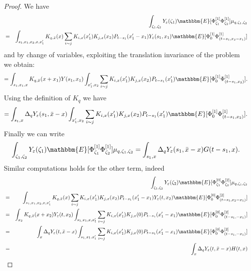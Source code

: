 \begin{proof}
  We have
  \begin{eqnarray*}
    &  & \int_{\zeta_1, \zeta_2} Y_{\varepsilon} (\zeta_1) \mathbbm{E}
    [\Phi^{[1]}_{\zeta_1} \Phi^{[1]}_{\zeta_2}] \mu_{q, \zeta_1, \zeta_2}\\
    & = & \int_{s_1, x_1, x_2, x, x_1'} K_{q, \bar{x}} (x) \sum_{i \sim j}
    K_{i, x} (x_1') K_{j, x} (x_2) P_{t - s_1} (x_1' - x_1) Y_{\varepsilon}
    (s_1, x_1) \mathbbm{E} [\Phi^{[1]}_0 \Phi^{[1]}_{(t - s_1, x_2 - x_1)}]
  \end{eqnarray*}
  and by change of variables, exploiting the translation invariance of the
  problem we obtain:
  \[ = \int_{s_1, x_1, x} K_{q, \bar{x}} (x + x_1) Y (s_1, x_1) \int_{x_1',
     x_2}  \sum_{i \sim j} K_{i, x} (x_1') K_{j, x} (x_2) P_{t - s_1} (x_1')
     \mathbbm{E} [\Phi^{[1]}_0 \Phi^{[1]}_{(t - s_1, x_2)}] . \]
  Using the definition of $K_q$ we have
  \[ = \int_{s_1, x} \Delta_q Y_{\varepsilon} (s_1, \bar{x} - x) \int_{x_1',
     x_2}  \sum_{i \sim j} K_{i, x} (x_1') K_{j, x} (x_2) P_{t - s_1} (x_1')
     \mathbbm{E} [\Phi^{[1]}_0 \Phi^{[1]}_{(t - s_1, x_2)}] . \]
  Finally we can write
  \[ \int_{\zeta_1, \zeta_2} Y_{\varepsilon} (\zeta_1) \mathbbm{E}
     [\Phi^{[1]}_{\zeta_1} \Phi^{[1]}_{\zeta_2}] \mu_{q, \zeta_1, \zeta_2} =
     \int_{s_1, x} \Delta_q Y_{\varepsilon} (s_1, \bar{x} - x) G (t - s_1, x)
     . \]
  Similar computations holds for the other term, indeed
  \begin{eqnarray*}
    &  & \int_{\zeta_1, \zeta_2} Y_{\varepsilon} (\zeta_2) \mathbbm{E}
    [\Phi^{[0]}_{\zeta_1} \Phi^{[2]}_{\zeta_2}] \mu_{q, \zeta_1, \zeta_2}\\
    & = & \int_{s_1, x_1, x_2, x, x_1'} K_{q, \bar{x}} (x) \sum_{i \sim j}
    K_{i, x} (x_1') K_{j, x} (x_2) P_{t - s_1} (x_1' - x_1) Y_{\varepsilon}
    (t, x_2) \mathbbm{E} [\Phi^{[0]}_0 \Phi^{[2]}_{(t - s_1, x_2 - x_1)}]\\
    & = & \int_{x_2} K_{q, \bar{x}} (x + x_2) Y_{\varepsilon} (t, x_2)
    \int_{s_{1,} x_1, x, x_1'}  \sum_{i \sim j} K_{i, x} (x_1') K_{j, x} (0)
    P_{t - s_1} (x_1' - x_1) \mathbbm{E} [\Phi^{[0]}_0 \Phi^{[2]}_{(t - s_1, -
    x_1)}]\\
    & = & \int_x \Delta_q Y_{\varepsilon} (t, \bar{x} - x) \int_{s_{1,} x_1,
    x_1'}  \sum_{i \sim j} K_{i, x} (x_1') K_{j, x} (0) P_{t - s_1} (x_1' -
    x_1) \mathbbm{E} [\Phi^{[0]}_0 \Phi^{[2]}_{(t - s_1, - x_1)}]\\
    & = & \int_x \Delta_q Y_{\varepsilon} (t, \bar{x} - x) H (t, x)
  \end{eqnarray*}
\end{proof}

